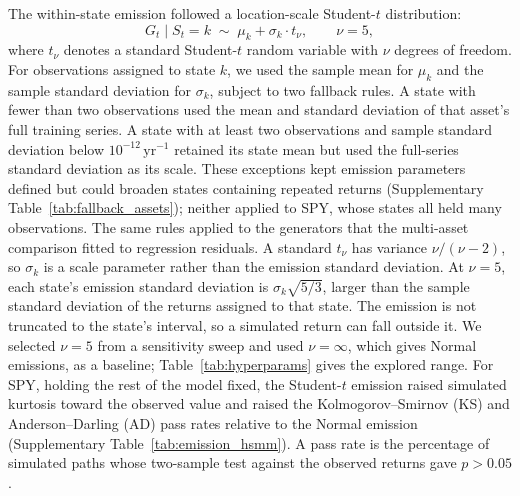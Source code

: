 The within-state emission followed a location-scale Student-$t$
distribution:
\begin{equation}
    G_t \mid S_t = k \;\sim\; \mu_k + \sigma_k \cdot t_{\nu},
    \qquad \nu = 5,
    \label{eq:emission}
\end{equation}
where $t_\nu$ denotes a standard Student-$t$ random variable with
$\nu$ degrees of freedom. For observations assigned to state $k$,
we used the sample mean for $\mu_k$ and the sample standard
deviation for $\sigma_k$, subject to two fallback rules. A state
with fewer than two observations used the mean and standard
deviation of that asset's full training series. A state with at
least two observations and sample standard deviation below $10^{-12}\,\mathrm{yr}^{-1}$
retained its state mean but used the full-series standard deviation
as its scale. These exceptions kept emission parameters defined but could broaden
states containing repeated returns (Supplementary Table~\ref{tab:fallback_assets});
neither applied to SPY, whose states all held many observations. The same rules applied to the
generators that the multi-asset comparison fitted to regression
residuals. A standard $t_\nu$ has variance $\nu/(\nu-2)$, so
$\sigma_k$ is a scale parameter rather than the emission standard
deviation. At $\nu=5$, each state's emission standard deviation is
$\sigma_k\sqrt{5/3}$, larger than the sample standard deviation of
the returns assigned to that state. The emission is not truncated to
the state's interval, so a simulated return can fall outside it. We
selected $\nu = 5$ from a
sensitivity sweep and used $\nu = \infty$, which gives Normal
emissions, as a baseline; Table~\ref{tab:hyperparams} gives the
explored range. For SPY, holding the rest of the model fixed, the
Student-$t$ emission raised simulated kurtosis toward the observed value and
raised the Kolmogorov--Smirnov (KS) and Anderson--Darling (AD) pass
rates relative to the Normal emission (Supplementary Table~\ref{tab:emission_hsmm}).
A pass rate is the percentage of simulated paths whose two-sample
test against the observed returns gave $p>0.05$.

